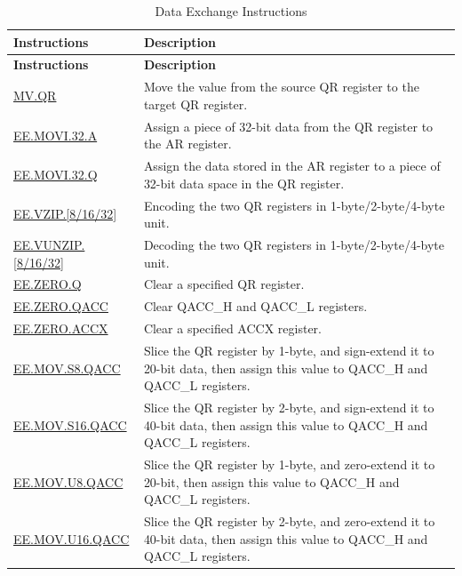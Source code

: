 \begin{longtable}[c]{|l|m{11cm}|}
    \caption{Data Exchange Instructions}
    \label{tab:pie-data-exchange-instructions}\\
    \hline
    \rowcolor{lightgray}
        \textbf{Instructions} & \textbf{Description} \\\hline
    \endfirsthead
    \rowcolor{lightgray}
    \textbf{Instructions} & \textbf{Description} \\\hline
    \endhead
    \endfoot

    \hyperref[instruction:MVQR]{MV.QR} & Move the value from the source QR register to the target QR register.
    \\\hline
    \hyperref[instruction:EEMOVI32A]{EE.MOVI.32.A} & Assign a piece of 32-bit data from the QR register to the AR register.
    \\\hline
    \hyperref[instruction:EEMOVI32Q]{EE.MOVI.32.Q} & Assign the data stored in the AR register to a piece of 32-bit data space in the QR register.
    \\\hline
    \hyperref[instruction:EEVZIP8]{EE.VZIP.[8/16/32]} & Encoding the two QR registers in 1-byte/2-byte/4-byte unit.
    \\\hline
    \hyperref[instruction:EEVUNZIP8]{EE.VUNZIP.[8/16/32]} & Decoding the two QR registers in 1-byte/2-byte/4-byte unit.
    \\\hline
    \hyperref[instruction:EEZEROQ]{EE.ZERO.Q} & Clear a specified QR register.
    \\\hline
    \hyperref[instruction:EEZEROQACC]{EE.ZERO.QACC} & Clear QACC\_H and QACC\_L registers.
    \\\hline
    \hyperref[instruction:EEZEROACCX]{EE.ZERO.ACCX} & Clear a specified ACCX register.
    \\\hline
    \hyperref[instruction:EEMOVS8QACC]{EE.MOV.S8.QACC} & Slice the QR register by 1-byte, and sign-extend it to 20-bit data, then assign this value to QACC\_H and QACC\_L registers.
    \\\hline
    \hyperref[instruction:EEMOVS16QACC]{EE.MOV.S16.QACC} & Slice the QR register by 2-byte, and sign-extend it to 40-bit data, then assign this value to QACC\_H and QACC\_L registers.
    \\\hline
    \hyperref[instruction:EEMOVU8QACC]{EE.MOV.U8.QACC} & Slice the QR register by 1-byte, and zero-extend it to 20-bit, then assign this value to QACC\_H and QACC\_L registers.
    \\\hline
    \hyperref[instruction:EEMOVU16QACC]{EE.MOV.U16.QACC} & Slice the QR register by 2-byte, and zero-extend it to 40-bit data, then assign this value to QACC\_H and QACC\_L registers.
    \\\hline
\end{longtable}